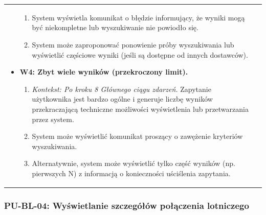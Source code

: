 \documentclass[a4paper,12pt]{article}
\begin{document}
\begin{longtable}{|p{\pierwszakolumnaszerokoscPUBLWyszukiwanie}|p{\drugakolumnaszerokoscPUBLWyszukiwanie}|}
\begin{itemize}
\begin{enumerate}
                    \item System wyświetla komunikat o błędzie informujący, że wyniki mogą być niekompletne lub wyszukiwanie nie powiodło się.
                    \item System może zaproponować ponowienie próby wyszukiwania lub wyświetlić częściowe wyniki (jeśli są dostępne od innych dostawców).
                \end{enumerate}
            \item \textbf{W4: Zbyt wiele wyników (przekroczony limit).}
                \begin{enumerate} \itemsep0pt \parskip0pt \parsep0pt
                    \item \textit{Kontekst: Po kroku 8 Głównego ciągu zdarzeń.} Zapytanie użytkownika jest bardzo ogólne i generuje liczbę wyników przekraczającą techniczne możliwości wyświetlenia lub przetwarzania przez system.
                    \item System może wyświetlić komunikat proszący o zawężenie kryteriów wyszukiwania.
                    \item Alternatywnie, system może wyświetlić tylko część wyników (np. pierwszych N) z informacją o konieczności uściślenia zapytania.
                \end{enumerate}
        \end{itemize} \\
\end{longtable}
\endgroup

\subsubsection{PU-BL-04: Wyświetlanie szczegółów połączenia lotniczego}

\begingroup %
\small %
\renewcommand{\arraystretch}{1.2} %

\newlength{\pierwszakolumnaszerokoscPUBLSzczegoly}
\setlength{\pierwszakolumnaszerokoscPUBLSzczegoly}{4.0cm}

\newlength{\drugakolumnaszerokoscPUBLSzczegoly}
\setlength{\drugakolumnaszerokoscPUBLSzczegoly}{\dimexpr\textwidth-\pierwszakolumnaszerokoscPUBLSzczegoly-2\tabcolsep-3\arrayrulewidth\relax}
\end{document}
